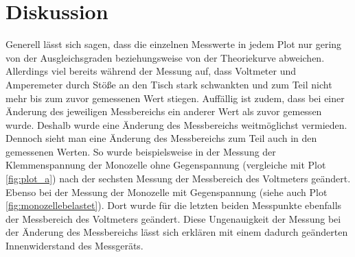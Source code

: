 \section{Diskussion}
\label{sec:Diskussion}
Generell lässt sich sagen, dass die einzelnen Messwerte in jedem Plot nur gering von der Ausgleichsgraden
beziehungsweise von der Theoriekurve abweichen. Allerdings viel bereits während der Messung auf, dass Voltmeter und Amperemeter durch Stöße an den Tisch
stark schwankten und zum Teil nicht mehr bis zum zuvor gemessenen Wert stiegen.
Auffällig ist zudem, dass bei einer Änderung des jeweiligen Messbereichs ein anderer Wert als zuvor gemessen wurde.
Deshalb wurde eine Änderung des Messbereichs weitmöglichst vermieden.
Dennoch sieht man eine Änderung des Messbereichs zum Teil auch in den gemessenen Werten. So wurde beispielsweise in der Messung
der Klemmenspannung der Monozelle ohne Gegenspannung (vergleiche mit Plot \ref{fig:plot_a}) nach der sechsten Messung der Messbereich des Voltmeters geändert.
Ebenso bei der Messung der Monozelle mit Gegenspannung (siehe auch Plot \ref{fig:monozellebelastet}). Dort wurde für die letzten beiden Messpunkte
ebenfalls der Messbereich des Voltmeters geändert.
Diese Ungenauigkeit der Messung bei der Änderung des Messbereichs lässt sich erklären mit einem dadurch geänderten Innenwiderstand des Messgeräts.
